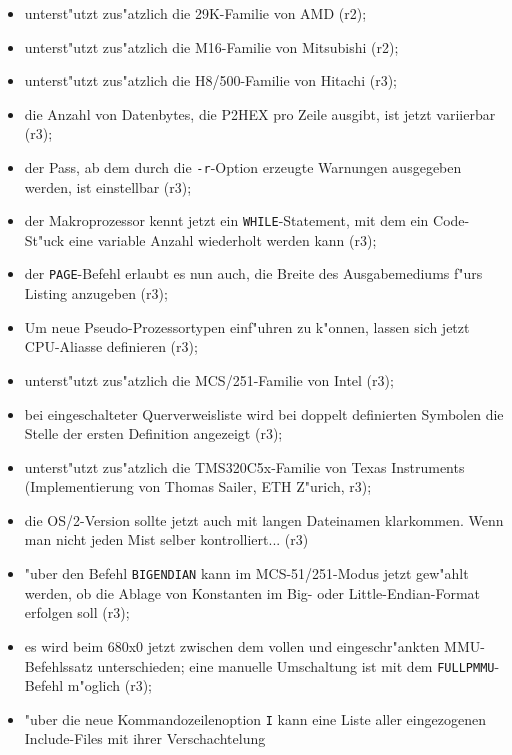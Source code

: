 \documentclass[12pt,a4paper,twoside]{report}
\newcommand{\tty}[1]{{\tt #1}}
\begin{document}
\begin{itemize}
{\begin{itemize}
{            Stern gekennzeichnet (r2);}
      \item{unterst"utzt zus"atzlich die 29K-Familie von AMD (r2);}
      \item{unterst"utzt zus"atzlich die M16-Familie von Mitsubishi (r2);}
      \item{unterst"utzt zus"atzlich die H8/500-Familie von Hitachi (r3);}
      \item{die Anzahl von Datenbytes, die P2HEX pro Zeile ausgibt, ist
            jetzt variierbar (r3);}
      \item{der Pass, ab dem durch die \tty{-r}-Option erzeugte Warnungen
            ausgegeben werden, ist einstellbar (r3);}
      \item{der Makroprozessor kennt jetzt ein \tty{WHILE}-Statement,
            mit dem ein Code-St"uck eine variable Anzahl wiederholt werden
	    kann (r3);}
      \item{der \tty{PAGE}-Befehl erlaubt es nun auch, die Breite des
            Ausgabemediums f"urs Listing anzugeben (r3);}
      \item{Um neue Pseudo-Prozessortypen einf"uhren zu k"onnen, lassen
            sich jetzt CPU-Aliasse definieren (r3);}
      \item{unterst"utzt zus"atzlich die MCS/251-Familie von Intel (r3);}
      \item{bei eingeschalteter Querverweisliste wird bei doppelt
            definierten Symbolen die Stelle der ersten Definition
	    angezeigt (r3);}
      \item{unterst"utzt zus"atzlich die TMS320C5x-Familie von Texas
            Instruments (Implementierung von Thomas Sailer, ETH Z"urich,
            r3);}
      \item{die OS/2-Version sollte jetzt auch mit langen Dateinamen
            klarkommen.  Wenn man nicht jeden Mist selber kontrolliert...
	    (r3)}
      \item{"uber den Befehl \tty{BIGENDIAN} kann im MCS-51/251-Modus
            jetzt gew"ahlt werden, ob die Ablage von Konstanten im Big-
            oder Little-Endian-Format erfolgen soll (r3);}
      \item{es wird beim 680x0 jetzt zwischen dem vollen und eingeschr"ankten
            MMU-Befehlssatz unterschieden; eine manuelle Umschaltung ist mit dem
            \tty{FULLPMMU}-Befehl m"oglich (r3);}
      \item{"uber die neue Kommandozeilenoption \tty{I} kann eine Liste
            aller eingezogenen Include-Files mit ihrer Verschachtelung
}
\end{itemize}}
\end{itemize}
\end{document}

